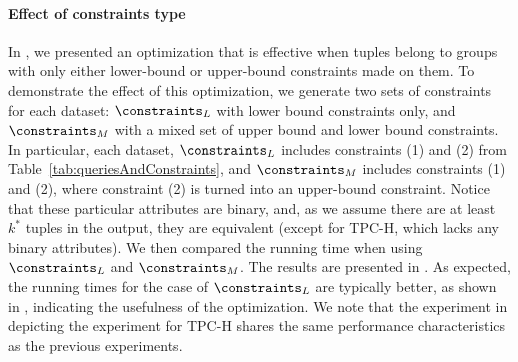 \paragraph*{Effect of constraints type}
In , we presented an optimization that is effective when tuples belong to groups with only either lower-bound or upper-bound constraints made on them. To demonstrate the effect of this optimization, we generate two sets of constraints for each dataset: $\constraints_{L}$ with lower bound constraints only, and $\constraints_{M}$ with a mixed set of upper bound and lower bound constraints. In particular, each dataset, $\constraints_{L}$ includes constraints (1) and (2) from Table~\ref{tab:queriesAndConstraints}, and $\constraints_{M}$ includes constraints (1) and (2), where constraint (2) is turned into an upper-bound constraint. 
Notice that these particular attributes are binary, and, as we assume there are at least $k^*$ tuples in the output, they are equivalent (except for TPC-H, which lacks any binary attributes). We then compared the running time when using $\constraints_{L}$ and $\constraints_{M}$. The results are presented in . As expected, the running times for the case of $\constraints_{L}$ are typically better, as shown in , indicating the usefulness of the optimization. We note that the experiment in  depicting the experiment for TPC-H shares the same performance characteristics as the previous experiments.



